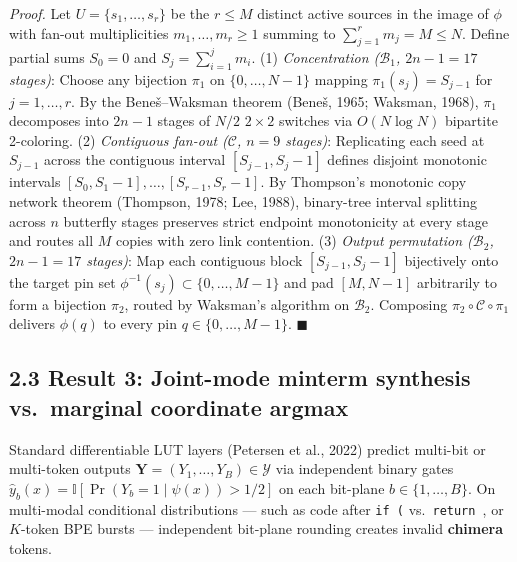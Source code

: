 \documentclass[10pt]{article}
\begin{document}
\emph{Proof.} Let $U = \{s_1, \dots, s_r\}$ be the $r \le M$ distinct active sources in the image of $\phi$ with fan-out multiplicities $m_1, \dots, m_r \ge 1$ summing to $\sum_{j=1}^r m_j = M \le N$. Define partial sums $S_0 = 0$ and $S_j = \sum_{i=1}^j m_i$.
(1) \emph{Concentration ($\mathcal{B}_1$, $2n-1 = 17$ stages)}: Choose any bijection $\pi_1$ on $\{0,\dots,N-1\}$ mapping $\pi_1(s_j) = S_{j-1}$ for $j=1,\dots,r$. By the Bene\v{s}--Waksman theorem (Bene\v{s}, 1965; Waksman, 1968), $\pi_1$ decomposes into $2n-1$ stages of $N/2$ $2\times 2$ switches via $O(N \log N)$ bipartite 2-coloring.
(2) \emph{Contiguous fan-out ($\mathcal{C}$, $n = 9$ stages)}: Replicating each seed at $S_{j-1}$ across the contiguous interval $[S_{j-1}, S_j - 1]$ defines disjoint monotonic intervals $[S_0, S_1-1], \dots, [S_{r-1}, S_r-1]$. By Thompson's monotonic copy network theorem (Thompson, 1978; Lee, 1988), binary-tree interval splitting across $n$ butterfly stages preserves strict endpoint monotonicity at every stage and routes all $M$ copies with zero link contention.
(3) \emph{Output permutation ($\mathcal{B}_2$, $2n-1 = 17$ stages)}: Map each contiguous block $[S_{j-1}, S_j-1]$ bijectively onto the target pin set $\phi^{-1}(s_j) \subset \{0,\dots,M-1\}$ and pad $[M, N-1]$ arbitrarily to form a bijection $\pi_2$, routed by Waksman's algorithm on $\mathcal{B}_2$. Composing $\pi_2 \circ \mathcal{C} \circ \pi_1$ delivers $\phi(q)$ to every pin $q \in \{0,\dots,M-1\}$. $\blacksquare$

\subsection{2.3 Result 3: Joint-mode minterm synthesis vs.\ marginal coordinate argmax}\label{result-3}

Standard differentiable LUT layers (Petersen et al., 2022) predict multi-bit or multi-token outputs $\mathbf{Y} = (Y_1, \dots, Y_B) \in \mathcal{Y}$ via independent binary gates $\hat{y}_b(x) = \mathbb{I}[\Pr(Y_b = 1 \mid \psi(x)) > 1/2]$ on each bit-plane $b \in \{1,\dots,B\}$. On multi-modal conditional distributions --- such as code after \texttt{if (} vs.\ \texttt{return }, or $K$-token BPE bursts --- independent bit-plane rounding creates invalid \textbf{chimera} tokens.
\end{document}
